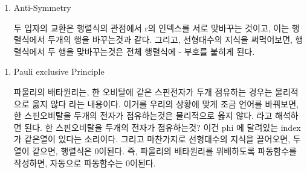 \documentclass[10pt]{article}
\begin{document}
\begin{enumerate}[label=\(\mathrm{i}\))]
\item {Anti-Symmetry}

두 입자의 교환은 행렬식의 관점에서 r의 인덱스를 서로 맞바꾸는 것이고, 이는 행렬식에서 두개의 행을 바꾸는것과 같다.
그리고, 선형대수의 지식을 써먹어보면, 행렬식에서 두 행을 맞바꾸는것은 전체 행렬식에 - 부호를 붙히게 된다. 
\end{enumerate}

\begin{enumerate}[label=\(\mathrm{ii}\))]
\item {Pauli exclusive Principle}

파울리의 배타원리는, 한 오비탈에 같은 스핀전자가 두개 점유하는 경우는 물리적으로 옳지 않다 라는 내용이다. 
이거를 우리의 상황에 맞게 조금 언어를 바꿔보면, 한 스핀오비탈을 두개의 전자가 점유하는것은 물리적으로 옳지 않다. 라고 해석하면 된다. 
한 스핀오비탈을 두개의 전자가 점유하는것? 이건 phi 에 달려있는 index가 같은열이 있다는 소리이다. 
그리고 마찬가지로 선형대수의 지식을 끌어오면, 두 열이 같으면, 행렬식은 0이된다. 
즉, 파울리의 배타원리를 위배하도록 파동함수를 작성하면, 자동으로 파동함수는 0이된다. 
\end{enumerate}
\end{document}
